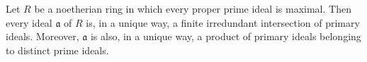 Let $R$ be a noetherian ring in which every proper prime ideal is maximal. Then every ideal $\mathfrak{a}$ of $R$ is, in a unique way, a finite irredundant intersection of primary ideals. Moreover, $\mathfrak{a}$ is also, in a unique way, a product of primary ideals belonging to distinct prime ideals.
